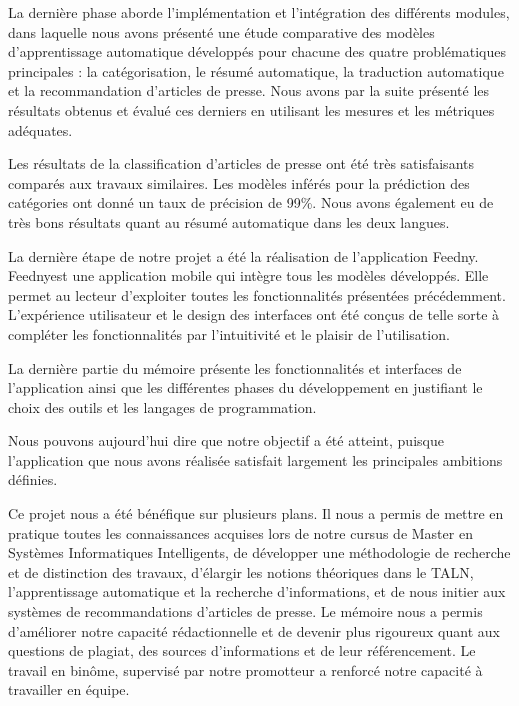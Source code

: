 La dernière phase aborde l'implémentation et l'intégration des différents modules, dans laquelle nous avons présenté une étude comparative des modèles d'apprentissage automatique développés pour chacune des quatre problématiques principales : la catégorisation, le résumé automatique, la traduction automatique et la recommandation d'articles de presse. Nous avons par la suite présenté les résultats obtenus et évalué ces derniers en utilisant les mesures et les métriques adéquates.
 
Les résultats de la classification d'articles de presse ont été très satisfaisants comparés aux travaux similaires. Les modèles inférés pour la prédiction des catégories ont donné un taux de précision de 99\%. Nous avons également eu de très bons résultats quant au résumé automatique dans les deux langues.
 
La dernière étape de notre projet a été la réalisation de l'application \textquotedbl Feedny\textquotedbl.\\
\textquotedbl Feedny\textquotedbl est une application mobile qui intègre tous les modèles développés. Elle permet au lecteur d'exploiter toutes les fonctionnalités présentées précédemment. L'expérience utilisateur et le design des interfaces ont été conçus de telle sorte à compléter les fonctionnalités par l'intuitivité et le plaisir de l'utilisation.
 
La dernière partie du mémoire présente les fonctionnalités et interfaces de l'application ainsi que les différentes phases du développement en justifiant le choix des outils et les langages de programmation.
 
Nous pouvons aujourd'hui dire que notre objectif a été atteint, puisque l'application que nous avons réalisée satisfait largement les principales ambitions définies.
 
Ce projet nous a été bénéfique sur plusieurs plans. Il nous a permis de mettre en pratique toutes les connaissances acquises lors de notre cursus de Master en Systèmes Informatiques Intelligents, de développer une méthodologie de recherche et de distinction des travaux, d'élargir les notions théoriques dans le TALN, l'apprentissage automatique et la recherche d'informations, et de nous initier aux systèmes de recommandations d'articles de presse. Le mémoire nous a permis d'améliorer notre capacité rédactionnelle et de devenir plus rigoureux quant aux questions de plagiat, des sources d'informations et de leur référencement. Le travail en binôme, supervisé par notre promotteur a renforcé notre capacité à travailler en équipe.
 

